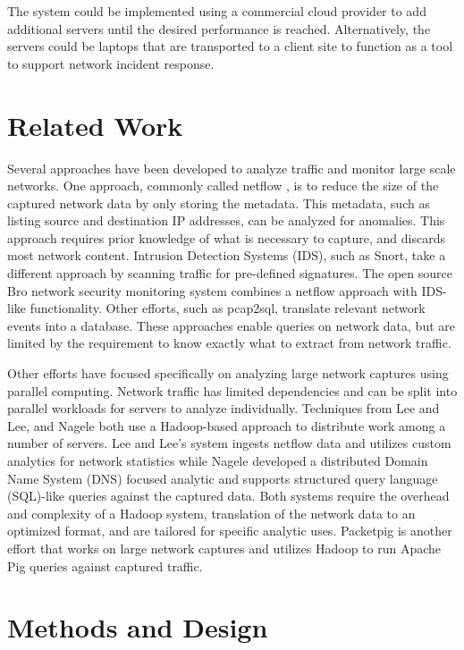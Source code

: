 \documentclass{article}
\begin{document}
\begin{multicols}{2}
The system could be implemented using a commercial cloud provider to add additional servers until the desired performance is reached. Alternatively, the servers could be laptops that are transported to a client site to function as a tool to support network incident response.

\section*{Related Work}

Several approaches have been developed to analyze traffic and monitor large scale networks. One approach, commonly called netflow \cite{netflow}, is to reduce the size of the captured network data by only storing the metadata. This metadata, such as listing source and destination IP addresses, can be analyzed for anomalies.  This approach requires prior knowledge of what is necessary to capture, and discards most network content. Intrusion Detection Systems (IDS), such as Snort\cite{snort}, take a different approach by scanning traffic for pre-defined signatures. The open source Bro network security monitoring system\cite{bro} combines a netflow approach with IDS-like functionality.  Other efforts, such as pcap2sql\cite{pcap2sql}, translate relevant network events into a database. These approaches enable queries on network data, but are limited by the requirement to know exactly what to extract from network traffic. 

Other efforts have focused specifically on analyzing large network captures using parallel computing. Network traffic has limited dependencies and can be split into parallel workloads for servers to analyze individually.  Techniques from Lee and Lee\cite{lee2013}, and Nagele\cite{ripecc2011} both use a Hadoop-based approach to distribute work among a number of servers.  Lee and Lee's system ingests netflow data and utilizes custom analytics for network statistics while Nagele developed a distributed Domain Name System (DNS) focused analytic and supports structured query language (SQL)-like queries against the captured data.  Both systems require the overhead and complexity of a Hadoop system, translation of the network data to an optimized format, and are tailored for specific analytic uses.  Packetpig\cite{packetpig} is another effort that works on large network captures and utilizes Hadoop to run Apache Pig queries against captured traffic. 

\section*{Methods and Design}


\end{multicols}
\end{document}
